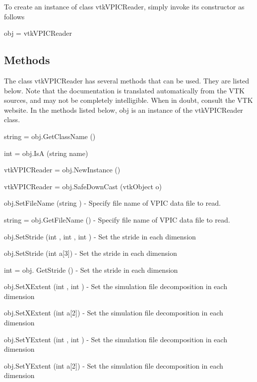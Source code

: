 To create an instance of class vtk\-V\-P\-I\-C\-Reader, simply invoke its constructor as follows \begin{DoxyVerb}  obj = vtkVPICReader
\end{DoxyVerb}
 \hypertarget{vtkwidgets_vtkxyplotwidget_Methods}{}\subsection{Methods}\label{vtkwidgets_vtkxyplotwidget_Methods}
The class vtk\-V\-P\-I\-C\-Reader has several methods that can be used. They are listed below. Note that the documentation is translated automatically from the V\-T\-K sources, and may not be completely intelligible. When in doubt, consult the V\-T\-K website. In the methods listed below, {\ttfamily obj} is an instance of the vtk\-V\-P\-I\-C\-Reader class. 
\begin{DoxyItemize}
\item {\ttfamily string = obj.\-Get\-Class\-Name ()}  
\item {\ttfamily int = obj.\-Is\-A (string name)}  
\item {\ttfamily vtk\-V\-P\-I\-C\-Reader = obj.\-New\-Instance ()}  
\item {\ttfamily vtk\-V\-P\-I\-C\-Reader = obj.\-Safe\-Down\-Cast (vtk\-Object o)}  
\item {\ttfamily obj.\-Set\-File\-Name (string )} -\/ Specify file name of V\-P\-I\-C data file to read.  
\item {\ttfamily string = obj.\-Get\-File\-Name ()} -\/ Specify file name of V\-P\-I\-C data file to read.  
\item {\ttfamily obj.\-Set\-Stride (int , int , int )} -\/ Set the stride in each dimension  
\item {\ttfamily obj.\-Set\-Stride (int a\mbox{[}3\mbox{]})} -\/ Set the stride in each dimension  
\item {\ttfamily int = obj. Get\-Stride ()} -\/ Set the stride in each dimension  
\item {\ttfamily obj.\-Set\-X\-Extent (int , int )} -\/ Set the simulation file decomposition in each dimension  
\item {\ttfamily obj.\-Set\-X\-Extent (int a\mbox{[}2\mbox{]})} -\/ Set the simulation file decomposition in each dimension  
\item {\ttfamily obj.\-Set\-Y\-Extent (int , int )} -\/ Set the simulation file decomposition in each dimension  
\item {\ttfamily obj.\-Set\-Y\-Extent (int a\mbox{[}2\mbox{]})} -\/ Set the simulation file decomposition in each dimension  

\end{DoxyItemize}
